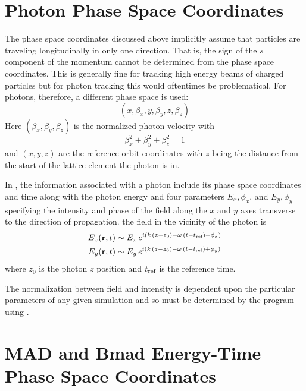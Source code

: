 \section{Photon Phase Space Coordinates}
\label{s:photon.phase.space}

The phase space coordinates discussed above implicitly assume that
particles are traveling longitudinally in only one direction. That is,
the sign of the $s$ component of the momentum cannot be determined
from the phase space coordinates. This is generally fine for tracking
high energy beams of charged particles but for photon tracking this
would oftentimes be problematical. For photons, therefore, a different
phase space is used:
\begin{equation}
  (x, \beta_x, y, \beta_y, z, \beta_z)
  \label{xbybzb}
\end{equation}
Here $(\beta_x, \beta_y, \beta_z)$ is the normalized photon velocity with
\begin{equation}
  \beta_x^2 + \beta_y^2 + \beta_z^2 = 1 
  \label{bbb1}
\end{equation}
and $(x, y, z)$ are the reference orbit coordinates with $z$ being the
distance from the start of the lattice element the photon is in.

In \bmad, the information associated with a photon include its phase
space coordinates and time along with the photon energy and four
parameters $E_x, \phi_x$, and $E_y, \phi_y$ specifying the intensity
and phase of the field along the $x$ and $y$ axes transverse to the
direction of propagation.  the field in the vicinity of the photon is
\begin{align}
  E_x ({\bf r}, t) &\sim E_x \, e^{i (k \, (z - z_0) - \omega \, (t - t_{\text{ref}}) + \phi_x)} \nonumber \\
  E_y ({\bf r}, t) &\sim E_y \, e^{i (k \, (z - z_0) - \omega \, (t - t_{\text{ref}}) + \phi_y)} 
  \label{ertee}
\end{align}
where $z_0$ is the photon $z$ position and $t_{\text{ref}}$ is the reference time.

The normalization between field and intensity is dependent upon the
particular parameters of any given simulation and so must be
determined by the program using \bmad.

\section{MAD and Bmad Energy-Time Phase Space Coordinates}
\label{energy.phase.space}

